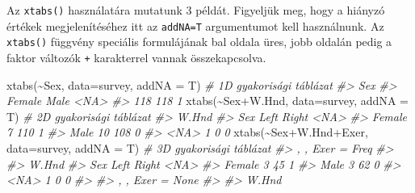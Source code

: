 \documentclass[
]{book}
\newenvironment{Shaded}{\begin{snugshade}}{\end{snugshade}}
\newcommand{\AttributeTok}[1]{\textcolor[rgb]{0.77,0.63,0.00}{#1}}
\newcommand{\CommentTok}[1]{\textcolor[rgb]{0.56,0.35,0.01}{\textit{#1}}}
\newcommand{\FunctionTok}[1]{\textcolor[rgb]{0.00,0.00,0.00}{#1}}
\newcommand{\NormalTok}[1]{#1}
\newcommand{\SpecialCharTok}[1]{\textcolor[rgb]{0.00,0.00,0.00}{#1}}
\begin{document}
\begin{Shaded}
\end{Shaded}

Az \texttt{xtabs()} használatára mutatunk 3 példát. Figyeljük meg, hogy a hiányzó értékek megjelenítéséhez itt az \texttt{addNA=T} argumentumot kell használnunk. Az \texttt{xtabs()} függvény speciális formulájának bal oldala üres, jobb oldalán pedig a faktor változók \texttt{+} karakterrel vannak összekapcsolva.

\begin{Shaded}
\begin{Highlighting}[]
\FunctionTok{xtabs}\NormalTok{(}\SpecialCharTok{\textasciitilde{}}\NormalTok{Sex, }\AttributeTok{data=}\NormalTok{survey, }\AttributeTok{addNA =}\NormalTok{ T)             }\CommentTok{\# 1D gyakorisági táblázat}
\CommentTok{\#\textgreater{} Sex}
\CommentTok{\#\textgreater{} Female   Male   \textless{}NA\textgreater{} }
\CommentTok{\#\textgreater{}    118    118      1}
\FunctionTok{xtabs}\NormalTok{(}\SpecialCharTok{\textasciitilde{}}\NormalTok{Sex}\SpecialCharTok{+}\NormalTok{W.Hnd, }\AttributeTok{data=}\NormalTok{survey, }\AttributeTok{addNA =}\NormalTok{ T)       }\CommentTok{\# 2D gyakorisági táblázat}
\CommentTok{\#\textgreater{}         W.Hnd}
\CommentTok{\#\textgreater{} Sex      Left Right \textless{}NA\textgreater{}}
\CommentTok{\#\textgreater{}   Female    7   110    1}
\CommentTok{\#\textgreater{}   Male     10   108    0}
\CommentTok{\#\textgreater{}   \textless{}NA\textgreater{}      1     0    0}
\FunctionTok{xtabs}\NormalTok{(}\SpecialCharTok{\textasciitilde{}}\NormalTok{Sex}\SpecialCharTok{+}\NormalTok{W.Hnd}\SpecialCharTok{+}\NormalTok{Exer, }\AttributeTok{data=}\NormalTok{survey, }\AttributeTok{addNA =}\NormalTok{ T)  }\CommentTok{\# 3D gyakorisági táblázat}
\CommentTok{\#\textgreater{} , , Exer = Freq}
\CommentTok{\#\textgreater{} }
\CommentTok{\#\textgreater{}         W.Hnd}
\CommentTok{\#\textgreater{} Sex      Left Right \textless{}NA\textgreater{}}
\CommentTok{\#\textgreater{}   Female    3    45    1}
\CommentTok{\#\textgreater{}   Male      3    62    0}
\CommentTok{\#\textgreater{}   \textless{}NA\textgreater{}      1     0    0}
\CommentTok{\#\textgreater{} }
\CommentTok{\#\textgreater{} , , Exer = None}
\CommentTok{\#\textgreater{} }
\CommentTok{\#\textgreater{}         W.Hnd}

\end{Highlighting}
\end{Shaded}
\end{document}
